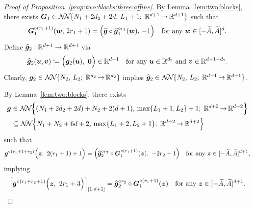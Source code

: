 \documentclass[nohyperref]{article}
\theoremstyle{plain}
\theoremstyle{definition}
\theoremstyle{remark}
\begin{document}
\begin{proof}[Proof of Proposition~\ref{prop:two:blocks:three:affine}]
	
	
	By Lemma~\ref{lem:two:blocks}, there exists
	$\bmG_1\in\nn{N_1+2d_2+2d}{L_1+1}{d+1}{d+1}$ such that
	\begin{equation*}
		{\bm{G}}_1^{\circ (r_1+1)}({\bm{w}},\,2r_1+1)=
		\Big({\bm{\widehat{g}}}\circ {\bm{\widehat{g}}}_1^{\circ r_1}({\bm{w}}),\,   -1\Big)
		\quad \textnormal{for any ${\bm{w}}\in [-{\widetilde{A}},{\widetilde{A}}]^{d}$.}
	\end{equation*}
	Define $\bmhatg_2:\R^{d+1}\to\R^{d+1}$ via
	\begin{equation*}
		\bmhatg_2(\bmu,\bmv)\coloneqq \Big(\bmg_2(\bmu),\   \bmzero\Big)\in\R^{d+1}\quad\tn{for any $\bmu\in \R^{d_2}$ and $\bmv\in \R^{d+1-d_2}$}.
	\end{equation*}
	Clearly, $\bmg_2\in \nn{N_2}{L_2}{d_2}{d_2}$ implies 
	$\bmhatg_2\in \nn{N_2}{L_2}{d+1}{d+1}$.
	
	By Lemma~\ref{lem:two:blocks}, there exists
	\begin{equation*}
		\begin{split}
			\bmg&\in\nn[\Big]{(N_1+2d_2+2d)+N_2+2(d+1)}{\max\{L_1+1,L_2\}+1}{d+2}{d+2}\\
			& \subseteq  \nn[\Big]{N_1+N_2+6d+2}{\max\{L_1+2,L_2+1\}}{d+2}{d+2}
		\end{split}
	\end{equation*}
	such that
	\begin{equation*}
		\bmg^{\circ (r_1+1+r_2)}\Big(\bmz,\  2(r_1+1)+1\Big)=
		\Big(\bmhatg_2^{\circ r_2}\circ \bmG_1^{\circ (r_1+1)}(\bmz),\ -2r_2+1\Big)
		\quad \tn{for any $\bmz\in [-\tildeA,\tildeA]^{d+1}$,}
	\end{equation*}
	implying 
	\begin{equation*}
		\Big[{\bm{g}}^{\circ (r_1+r_2+1)}\Big({\bm{z}},\  2r_1+3\Big)\Big]_{[1:d+1]}=
		{\bm{\widehat{g}}}_2^{\circ r_2}\circ {\bm{G}}_1^{\circ (r_1+1)}({\bm{z}})
		\quad \textnormal{for any ${\bm{z}}\in [-{\widetilde{A}},{\widetilde{A}}]^{d+1}$.}
	\end{equation*}
	

\end{proof}
\end{document}
